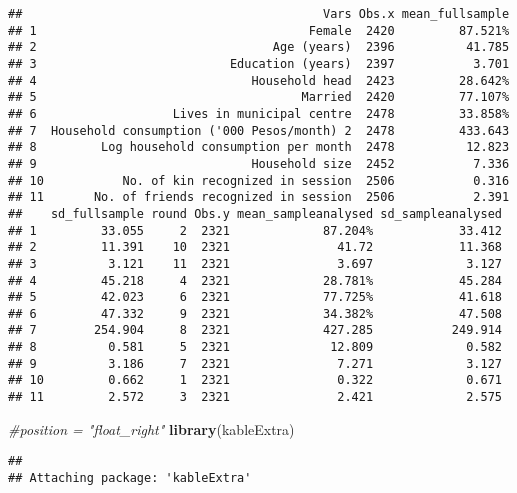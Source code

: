 \documentclass[]{article}
\newenvironment{Shaded}{\begin{snugshade}}{\end{snugshade}}
\newcommand{\KeywordTok}[1]{\textcolor[rgb]{0.13,0.29,0.53}{\textbf{#1}}}
\newcommand{\StringTok}[1]{\textcolor[rgb]{0.31,0.60,0.02}{#1}}
\newcommand{\CommentTok}[1]{\textcolor[rgb]{0.56,0.35,0.01}{\textit{#1}}}
\newcommand{\OtherTok}[1]{\textcolor[rgb]{0.56,0.35,0.01}{#1}}
\newcommand{\OperatorTok}[1]{\textcolor[rgb]{0.81,0.36,0.00}{\textbf{#1}}}
\newcommand{\NormalTok}[1]{#1}
\begin{document}
\begin{verbatim}
##                                          Vars Obs.x mean_fullsample
## 1                                      Female  2420         87.521%
## 2                                 Age (years)  2396          41.785
## 3                           Education (years)  2397           3.701
## 4                              Household head  2423         28.642%
## 5                                     Married  2420         77.107%
## 6                   Lives in municipal centre  2478         33.858%
## 7  Household consumption ('000 Pesos/month) 2  2478         433.643
## 8         Log household consumption per month  2478          12.823
## 9                              Household size  2452           7.336
## 10           No. of kin recognized in session  2506           0.316
## 11       No. of friends recognized in session  2506           2.391
##    sd_fullsample round Obs.y mean_sampleanalysed sd_sampleanalysed
## 1         33.055     2  2321             87.204%            33.412
## 2         11.391    10  2321               41.72            11.368
## 3          3.121    11  2321               3.697             3.127
## 4         45.218     4  2321             28.781%            45.284
## 5         42.023     6  2321             77.725%            41.618
## 6         47.332     9  2321             34.382%            47.508
## 7        254.904     8  2321             427.285           249.914
## 8          0.581     5  2321              12.809             0.582
## 9          3.186     7  2321               7.271             3.127
## 10         0.662     1  2321               0.322             0.671
## 11         2.572     3  2321               2.421             2.575
\end{verbatim}

\begin{Shaded}
\end{Shaded}

\begin{Shaded}
\begin{Highlighting}[]
\CommentTok{#position = "float_right" }
\KeywordTok{library}\NormalTok{(kableExtra)}
\end{Highlighting}
\end{Shaded}

\begin{verbatim}
## 
## Attaching package: 'kableExtra'
\end{verbatim}
\end{document}
